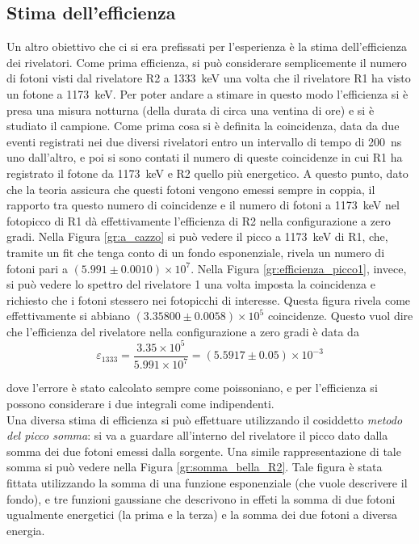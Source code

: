 \subsection{Stima dell'efficienza}
Un altro obiettivo che ci si era prefissati per l'esperienza è la stima dell'efficienza dei rivelatori. Come prima efficienza, si può considerare semplicemente il numero
di fotoni visti dal rivelatore R2 a 1333~keV una volta che il rivelatore R1 ha visto un fotone a 1173~keV. Per poter andare a stimare in questo modo l'efficienza si è presa
una misura notturna (della durata di circa una ventina di ore) e si è studiato il campione. Come prima cosa si è definita la coincidenza, data da due eventi
registrati nei due diversi rivelatori entro un intervallo di tempo di 200~ns uno dall'altro, e poi si sono contati il numero di queste coincidenze in cui R1 ha registrato
il fotone da 1173~keV e R2 quello più energetico. A questo punto, dato che la teoria assicura che questi fotoni vengono emessi sempre in coppia, il rapporto tra questo
numero di coincidenze e il numero di fotoni a 1173~keV nel fotopicco di R1 dà effettivamente l'efficienza di R2 nella configurazione a zero gradi. Nella
Figura \ref{gr:a_cazzo} si può vedere il picco a 1173~keV di R1, che, tramite un fit che tenga conto di un fondo esponenziale, rivela un numero
di fotoni pari a $(5.991 \pm 0.0010)\times 10^7$.
Nella Figura \ref{gr:efficienza_picco1}, invece, si può vedere lo spettro del rivelatore 1 una volta imposta la coincidenza e richiesto che i fotoni stessero
nei fotopicchi di interesse. Questa figura rivela come effettivamente si abbiano $(3.35800 \pm 0.0058)\times 10^5$ coincidenze. Questo vuol dire che l'efficienza del 
rivelatore nella configurazione
a zero gradi è data da
$$\varepsilon_{1333}=\frac{3.35\times 10^5}{5.991 \times 10^7}=(5.5917 \pm 0.05)\times 10^{-3}$$
%
%

dove l'errore è stato calcolato sempre come poissoniano, e per l'efficienza si possono considerare i due integrali come indipendenti.\\

\FloatBarrier
Una diversa stima di efficienza si può effettuare utilizzando il cosiddetto \textit{metodo del picco somma}: si va a guardare all'interno del rivelatore il picco dato dalla 
somma dei due fotoni emessi dalla sorgente. Una simile rappresentazione di tale somma si può vedere nella Figura \ref{gr:somma_bella_R2}. Tale figura è stata fittata 
utilizzando la somma di una funzione esponenziale (che vuole descrivere il fondo), e tre funzioni gaussiane che descrivono in effeti la somma di due fotoni ugualmente energetici
(la prima e la terza) e la somma dei due fotoni a diversa energia.\\


